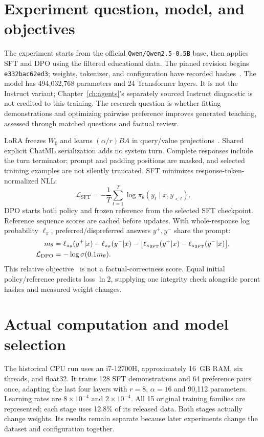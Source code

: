 \section{Experiment question, model, and objectives}
The experiment starts from the official \texttt{Qwen/Qwen2.5-0.5B} base, then applies SFT and DPO using the filtered educational data. The pinned revision begins \texttt{e332bac62ed3}; weights, tokenizer, and configuration have recorded hashes~\cite{qwenbase}. The model has 494,032,768 parameters and 24 Transformer layers. It is not the Instruct variant; Chapter~\ref{ch:agents}'s separately sourced Instruct diagnostic is not credited to this training. The research question is whether fitting demonstrations and optimizing pairwise preference improves generated teaching, assessed through matched questions and factual review.

LoRA freezes $W_0$ and learns $(\alpha/r)BA$ in query/value projections~\cite{lora}. Shared explicit ChatML serialization adds no system turn. Complete responses include the turn terminator; prompt and padding positions are masked, and selected training examples are not silently truncated. SFT minimizes response-token-normalized NLL:
\begin{equation}
\mathcal L_{\mathrm{SFT}}=-\frac1T\sum_{t=1}^T\log\pi_\theta(y_t\mid x,y_{<t}).
\label{eq:training-sft}
\end{equation}
DPO starts both policy and frozen reference from the selected SFT checkpoint. Reference sequence scores are cached before updates. With whole-response log probability $\ell_\pi$, preferred/dispreferred answers $y^+,y^-$ share the prompt:
\begin{align}
m_\theta&=\ell_{\pi_\theta}(y^+|x)-\ell_{\pi_\theta}(y^-|x)
-\bigl[\ell_{\pi_{\rm SFT}}(y^+|x)-\ell_{\pi_{\rm SFT}}(y^-|x)\bigr],\\
\mathcal L_{\mathrm{DPO}}&=-\log\sigma(0.1m_\theta).
\label{eq:training-dpo}
\end{align}
This relative objective~\cite{dpo} is not a factual-correctness score. Equal initial policy/reference predicts loss $\ln2$, supplying one integrity check alongside parent hashes and measured weight changes.

\section{Actual computation and model selection}
The historical CPU run uses an i7-12700H, approximately 16~GB RAM, six threads, and float32. It trains 128 SFT demonstrations and 64 preference pairs once, adapting the last four layers with $r=8$, $\alpha=16$ and 90,112 parameters. Learning rates are $8\times10^{-4}$ and $2\times10^{-4}$. All 15 original training families are represented; each stage uses 12.8\% of its released data. Both stages actually change weights. Its results remain separate because later experiments change the dataset and configuration together.

